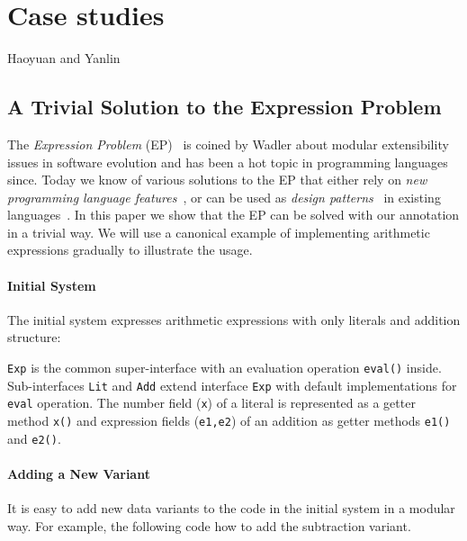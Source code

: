 \section{Case studies}
Haoyuan and Yanlin

\subsection{A Trivial Solution to the Expression Problem}

The \emph{Expression Problem} (EP)~\cite{wadler98expression-problem} is coined
by Wadler about modular extensibility issues in software evolution and has been
a hot topic in programming languages since. Today we know of various solutions
to the EP that either rely on \emph{new programming language
  features}~\cite{chambers95multimethods,clifton00multiJava,madsen89virtual,nystrom06j,bruce98astatically,McDirmid01jiazzi,garrigue98polymorphic,zenger01extensible,loh06open,wehr11javaGI},
or can be used as \emph{design patterns}~\cite{gof} in existing
languages~\cite{torgersen04theexpression,oliveira06extensible,wouter08datatypes,oliveira09modular,oliveira12extensibility}. In
this paper we show that the EP can be solved with our \mixin annotation in a
trivial way. We will use a canonical example of implementing arithmetic
expressions gradually to illustrate the usage. 

\paragraph{\textbf{Initial System}}
The initial system expresses arithmetic expressions with only literals and
addition structure:


\texttt{Exp} is the common super-interface with an evaluation operation
\texttt{eval()} inside. Sub-interfaces \texttt{Lit} and \texttt{Add} extend
interface \texttt{Exp} with default implementations for \texttt{eval}
operation. The number field (\texttt{x}) of a literal is represented as a getter
method \texttt{x()} and expression fields (\texttt{e1,e2}) of an addition as
getter methods \texttt{e1()} and \texttt{e2()}.

\paragraph{\textbf{Adding a New Variant}} 
It is easy to add new data variants to the code in the initial system in a
modular way. For example, the following code how to add the subtraction variant.

